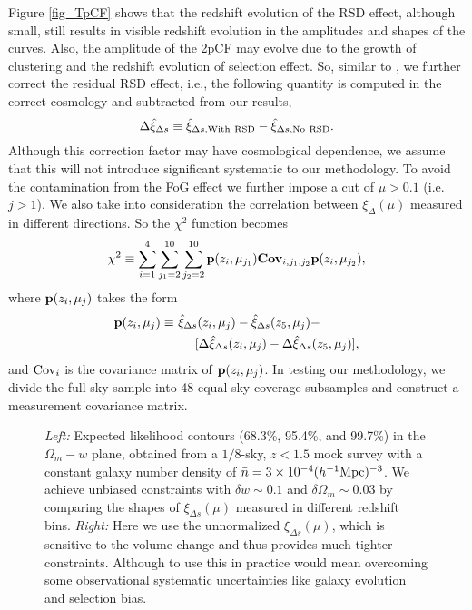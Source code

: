 \documentclass[useAMS,usenatbib]{mn2e}
\begin{document}
Figure \ref{fig_TpCF} shows that the redshift evolution of the RSD effect, although small,
still results in visible redshift evolution in the amplitudes and shapes of the curves.
Also, the amplitude of the 2pCF may evolve due to the growth of clustering and the redshift evolution of selection effect.
So, similar to \cite{Li2014}, we further correct the residual RSD effect, i.e.,
the following quantity is computed in the correct cosmology and subtracted from our results,
\begin{equation}\label{eq:rsdcor}
 \Delta \hat\xi_{\Delta s} \equiv \hat\xi_{\Delta s, {\rm With\ RSD}} - \hat\xi_{\Delta s, \rm No\ RSD}.
\end{equation}
Although this correction factor may have cosmological dependence, we assume that this will not introduce significant systematic to our methodology.
To avoid the contamination from the FoG effect we further impose a cut of $\mu>0.1$ (i.e. $j>1$).
We also take into consideration the correlation between $\xi_{\Delta}(\mu)$ measured in different directions.
So the $\chi^2$ function becomes
\begin{equation}\label{eq:chisq1}
\chi^2\equiv \sum_{i=1}^{4} \sum_{j_1=2}^{10} \sum_{j_2=2}^{10} {\bf p}(z_i,\mu_{j_1}) {\bf Cov}_{i,j_1,j_2}  {\bf p}(z_i,\mu_{j_2}),
\end{equation}
where ${\bf p}(z_i,\mu_{j})$ takes the form
\begin{eqnarray}\label{eq:bfp}
 {\bf p}(z_i,\mu_{j}) \equiv&\ \hat\xi_{\Delta s}(z_i,\mu_j)-\hat\xi_{\Delta s}(z_5,\mu_j) - \nonumber\\
   &\ \ \ \ \ [\Delta\hat\xi_{\Delta s}(z_i,\mu_j)-\Delta\hat\xi_{\Delta s}(z_5,\mu_j)],
\end{eqnarray}
and ${\rm Cov}_i$ is the covariance matrix of ${\bf p}(z_i,\mu_{j})$. 
In testing our methodology, we divide the full sky sample into 48 equal sky coverage subsamples
and construct a measurement covariance matrix. 

\begin{figure*}
   \caption{\label{fig_contours}
   {\em Left:} Expected likelihood contours (68.3\%, 95.4\%, and 99.7\%) in the $\Omega_m-w$ plane,
   obtained from a $1/8$-sky, $z<1.5$ mock survey with a constant galaxy number density of $\bar n=3\times10^{-4}(h^{-1}{\rm Mpc})^{-3}$.
   We achieve unbiased constraints with $\delta w\sim0.1$ and $\delta \Omega_m\sim0.03$ 
   by comparing the shapes of $\xi_{\Delta s}(\mu)$ measured in different redshift bins.
   {\em Right:} Here we use the unnormalized $\xi_{\Delta s}(\mu)$, 
   which is sensitive to the volume change and thus provides much tighter constraints. 
   Although to use this in practice would mean overcoming some observational systematic uncertainties like galaxy evolution and selection bias.
   }
\end{figure*}
\end{document}
